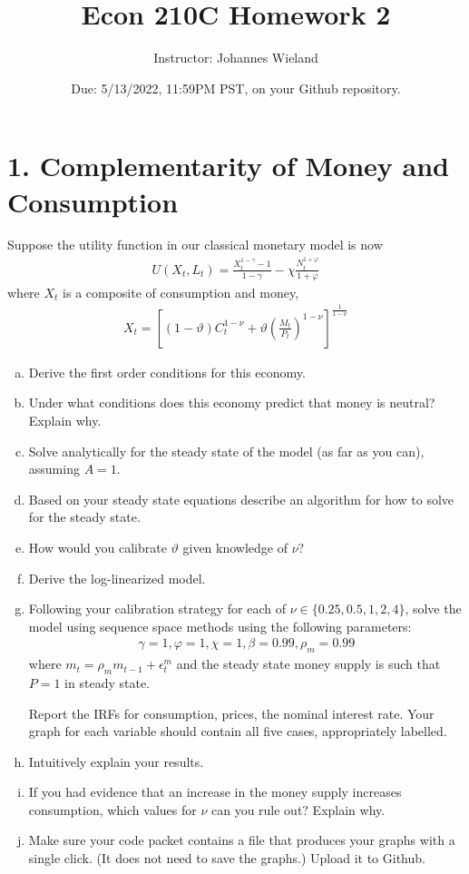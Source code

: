 \documentclass{article}
\newcommand{\1}{\mathbf{1}}
\begin{document}
\title{Econ 210C Homework 2}
\author{Instructor: Johannes Wieland}
\date{\color{red} Due: 5/13/2022, 11:59PM PST, on your Github repository.}
\maketitle




\section*{1. Complementarity of Money and Consumption}
Suppose the utility function in our classical monetary model is now
\begin{align*}
	U(X_t,L_t)=\frac{X_t^{1-\gamma}-1}{1-\gamma}-\chi \frac{N_t^{1+\varphi}}{{1+\varphi}}
\end{align*}
where $X_t$ is a composite of consumption and money,
\begin{align*}
	X_t=\left[(1-\vartheta)C_t^{1-\nu}+\vartheta\left(\frac{M_t}{P_t}\right)^{1-\nu}\right]^{\frac{1}{1-\nu}}
\end{align*}
\begin{enumerate}[(a)]
	\item Derive the first order conditions for this economy.
	\item Under what conditions does this economy predict that money is neutral? Explain why.
	\item Solve analytically for the steady state of the model (as far as you can), assuming $A=1$.
	\item Based on your steady state equations describe an algorithm for how to solve for the steady state.
	\item How would you calibrate $\vartheta$ given knowledge of $\nu$?
	\item Derive the log-linearized model. 
	\item Following your calibration strategy for each of $\nu\in\{0.25,0.5,1,2,4\}$, solve the model using sequence space methods using the following parameters:
	\begin{align*} \gamma=1,\varphi=1,\chi=1,\beta=0.99,\rho_m=0.99
	\end{align*}
	where $m_t = \rho_m m_{t-1} + \epsilon_t^m$ and the steady state money supply is such that $P=1$ in steady state.
	
	Report the IRFs for consumption, prices, the nominal interest rate. Your graph for each variable should contain all five cases, appropriately labelled. 
	\item Intuitively explain your results.
	\item If you had evidence that an increase in the money supply increases consumption, which values for $\nu$ can you rule out? Explain why.
	\item Make sure your code packet contains a file that produces your graphs with a single click. (It does not need to save the graphs.) Upload it to Github.
\end{enumerate}
\end{document}
